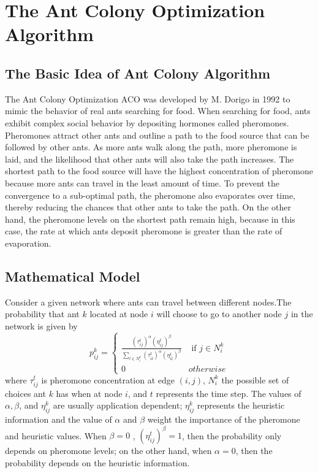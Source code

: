 \documentclass[conference]{IEEEtran}
\begin{document}
\section{The Ant Colony Optimization Algorithm}
\subsection{The Basic Idea of Ant Colony Algorithm}
The Ant Colony Optimization ACO was developed by M. Dorigo in 1992 to mimic the behavior of real ants searching for food. When searching for food, ants exhibit complex social behavior by depositing hormones called pheromones.  Pheromones attract other ants and outline a path to the food source that can be followed by other ants. As more ants walk along the path, more pheromone is laid, and the likelihood that other ants will also take the path increases.  The shortest path to the food source will have the highest concentration of pheromone because more ants can travel in the least amount of time. To prevent the convergence to a sub-optimal path, the pheromone also evaporates over time, thereby reducing the chances that other ants to take the path. On the other hand, the pheromone levels on the shortest path remain high, because in this case, the rate at which ants deposit pheromone is greater than the rate of evaporation. \cite{5541300}
\subsection{Mathematical Model}
Consider a given network where ants can travel between different nodes.The probability that  ant $k$ located at node $i$ will choose to go to another node $j$ in the network is given by
\begin{equation}
    p_{ij}^{k} = 
    \begin{cases}
    \frac{(\tau_{ij}^{t})^\alpha (\eta_{ij}^{t})^\beta}{\sum_{l \in N_{i}^{k} } (\tau_{il}^{t})^\alpha (\eta_{il}^{t})^\beta} & \text{ if  } j \in N_{i}^{k}\\
    0 & otherwise
    \end{cases}
\end{equation}
where $\tau_{ij}^{t}$ is pheromone concentration at edge $(i,j)$, $N_{i}^{k}$ the possible set of choices ant $k$ has when at node $i$, and $t$ represents the time step. The values of $\alpha,\beta$, and $\eta_{ij}^{k}$ are usually application dependent; $\eta_{ij}^{k}$ represents the heuristic information and the value of $\alpha$ and $\beta$ weight the importance of the pheromone and heuristic values. 
When $\beta = 0$ , $(\eta_{ij}^{t})^\beta = 1$, then the probability only depends on pheromone levels; on the other hand, when $\alpha=0$, then the probability depends on the heuristic information.
\end{document}
